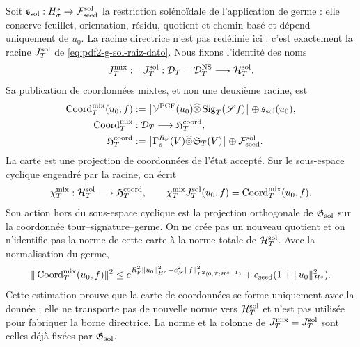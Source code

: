Soit
$\mathfrak s_{\rm sol}:H^s_\sigma\to\mathcal F_{\rm seed}^{\rm sol}$ la
restriction solénoïdale de l'application de germe : elle conserve feuillet, orientation, résidu,
quotient et chemin basé et dépend uniquement de $u_0$. La racine directrice n'est pas
redéfinie ici : c'est exactement la racine $J_T^{\rm sol}$ de
\eqref{eq:pdf2-g-sol-raiz-dato}. Nous fixons l'identité des noms
\begin{equation}\label{eq:pdf2-ns-root-identification}
 J_T^{\rm mix}:=J_T^{\rm sol}:
 \mathcal D_T=\mathcal D_T^{\rm NS}\longrightarrow\mathcal H_T^{\rm sol}.
\end{equation}
Sa publication de coordonnées mixtes, et non une deuxième racine, est
\begin{equation}\label{eq:pdf2-ns-root-map}
 \begin{aligned}
 \operatorname{Coord}_T^{\rm mix}(u_0,f)&:=
 \bigl[\mathcal V^{\rm PCF}(u_0)
 \widehat\otimes\operatorname{Sig}_T(\mathscr Sf)\bigr]
 \oplus\mathfrak s_{\rm sol}(u_0),\\
 \operatorname{Coord}_T^{\rm mix}&:\mathcal D_T\longrightarrow
 \mathfrak H_T^{\rm coord},\\
 \mathfrak H_T^{\rm coord}&:=
 \bigl[\Gamma_s^{R_{\rm F}}(V)
 \widehat\otimes\mathfrak S_T(V)\bigr]
 \oplus\mathcal F_{\rm seed}^{\rm sol}.
 \end{aligned}
\end{equation}
La carte est une projection de coordonnées de l'état accepté. Sur le sous-espace
cyclique engendré par la racine, on écrit
\begin{equation}\label{eq:pdf2-ns-mixed-coordinate-chart}
 \chi_T^{\rm mix}:\mathcal H_T^{\rm sol}\longrightarrow
 \mathfrak H_T^{\rm coord},
 \qquad
 \chi_T^{\rm mix}J_T^{\rm sol}(u_0,f)
 =\operatorname{Coord}_T^{\rm mix}(u_0,f).
\end{equation}
Son action hors du sous-espace cyclique est la projection orthogonale de
$\mathfrak G_{\rm sol}$ sur la coordonnée tour--signature--germe. On ne crée pas
un nouveau quotient et on n'identifie pas la norme de cette carte à la norme totale
de $\mathcal H_T^{\rm sol}$.
Avec la normalisation du germe,
\begin{equation}\label{eq:pdf2-ns-root-norm}
 \|\operatorname{Coord}_T^{\rm mix}(u_0,f)\|^2
 \leq e^{R_{\rm F}^2\|u_0\|_{H^s}^2
             +c_{\mathscr S}^2\|f\|_{L^2(0,T;H^{s-1})}^2}
 +c_{\rm seed}(1+\|u_0\|_{H^s}^2).
\end{equation}
Cette estimation prouve que la carte de coordonnées se forme uniquement avec la donnée ;
elle ne transporte pas de nouvelle norme vers $\mathcal H_T^{\rm sol}$ et n'est pas utilisée pour fabriquer
la borne directrice. La norme et la colonne de $J_T^{\rm mix}=J_T^{\rm sol}$ sont
celles déjà fixées par $\mathfrak G_{\rm sol}$.

